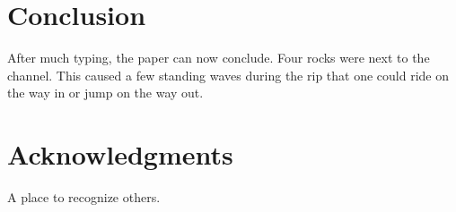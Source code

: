 \documentclass[]{aiaa-tc}%
\begin{document}
\section{Conclusion}

After much typing, the paper can now conclude.
Four rocks were next to the channel.
This caused a few standing waves during the rip that one could ride on
the way in or jump on the way out.

\section*{Acknowledgments}

A place to recognize others.
\end{document}
